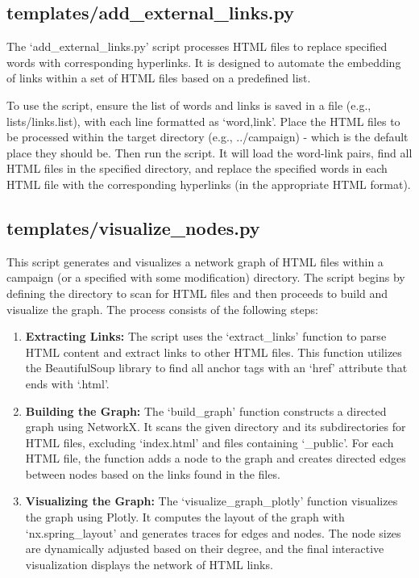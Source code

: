 \subsection{templates/add\_external\_links.py}

The `add\_external\_links.py' script processes HTML files to replace specified words with corresponding hyperlinks. It is designed to automate the embedding of links within a set of HTML files based on a predefined list. 

To use the script, ensure the list of words and links is saved in a file (e.g., lists/links.list), with each line formatted as `word,link'. Place the HTML files to be processed within the target directory (e.g., ../campaign) - which is the default place they should be. Then run the script. It will load the word-link pairs, find all HTML files in the specified directory, and replace the specified words in each HTML file with the corresponding hyperlinks (in the appropriate HTML format).










\subsection{templates/visualize\_nodes.py}

This script generates and visualizes a network graph of HTML files within a campaign (or a specified with some modification) directory. The script begins by defining the directory to scan for HTML files and then proceeds to build and visualize the graph. The process consists of the following steps:

\begin{enumerate}
    \item \textbf{Extracting Links:} The script uses the `extract\_links' function to parse HTML content and extract links to other HTML files. This function utilizes the BeautifulSoup library to find all anchor tags with an `href' attribute that ends with `.html'.
    
    \item \textbf{Building the Graph:} The `build\_graph' function constructs a directed graph using NetworkX. It scans the given directory and its subdirectories for HTML files, excluding `index.html' and files containing `_public'. For each HTML file, the function adds a node to the graph and creates directed edges between nodes based on the links found in the files.
    
    \item \textbf{Visualizing the Graph:} The `visualize\_graph\_plotly' function visualizes the graph using Plotly. It computes the layout of the graph with `nx.spring\_layout' and generates traces for edges and nodes. The node sizes are dynamically adjusted based on their degree, and the final interactive visualization displays the network of HTML links.
\end{enumerate}










